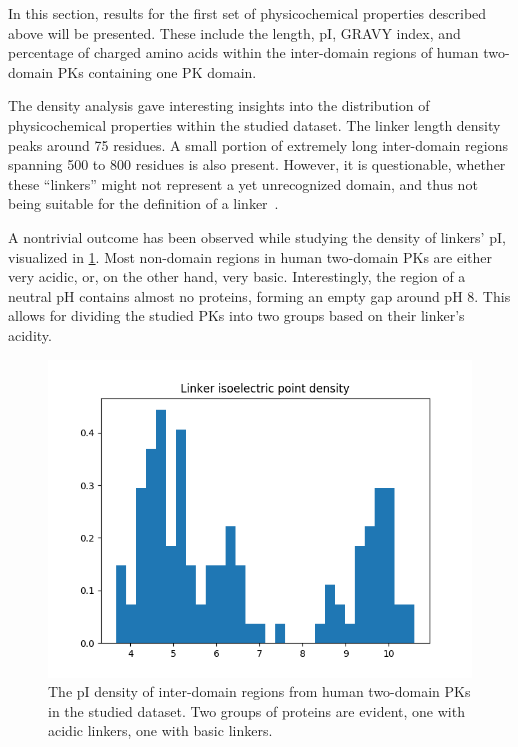 \label{res}

\label{res:first}

	In this section, results for the first set of physicochemical properties described
	above will be presented.
	These include the length, pI, GRAVY index, and percentage of charged amino acids within
	the inter-domain regions of human two-domain PKs containing one PK domain.

	\label{res:first:dens}

		The density analysis gave interesting insights into the distribution of
		physicochemical properties within the studied dataset.
		The linker length density peaks around 75 residues.
		A small portion of extremely long inter-domain regions spanning 500 to 800 residues is
		also present.
		However, it is questionable, whether these ``linkers'' might not represent a yet
		unrecognized domain, and thus not being suitable for the definition of a
		linker~\cite{milano2016structural}.

		A nontrivial outcome has been observed while studying the density of linkers' pI,
		visualized in \cref{fig:iso-dens}.
		Most non-domain regions in human two-domain PKs are either very acidic, or, on the
		other hand, very basic.
		Interestingly, the region of a neutral pH contains almost no proteins, forming an
		empty gap around pH 8.
		This allows for dividing the studied PKs into two groups based on their linker's
		acidity.

		\begin{figure}
			\centering
			\includegraphics[width=.7\linewidth]{img/iso_density.png}
			\caption{The pI density of inter-domain regions from human two-domain PKs in the
			studied dataset.
			Two groups of proteins are evident, one with acidic linkers, one with basic
			linkers.}
			\label{fig:iso-dens}
		\end{figure}

